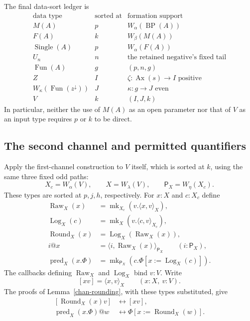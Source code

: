 The final data-sort ledger is
\[
\begin{array}{c|c|l}
\text{data type}&\text{sorted at}&\text{formation support}\\ \hline
M(A)&p&W_{\alpha}(\operatorname{BP}(A))\\
F(A)&k&W_{\beta}(M(A))\\
\operatorname{Single}(A)&p&W_{\alpha}(F(A))\\
U_n&n&\text{the retained negative's fixed tail}\\
\operatorname{Fun}(A)&g&(p,n,g)\\
Z&I&\zeta:\operatorname{Ax}(s)\longrightarrow I\text{ positive}\\
W_{\kappa}(\operatorname{Fun}(z^\downarrow))&J&\kappa:g\longrightarrow J\text{ even}\\
V&k&(I,J,k)
\end{array}
\]
In particular, neither the use of $M(A)$ as an open parameter nor that of
$V$ as an input type requires $p$ or $k$ to be direct.

\subsection{The second channel and permitted quantifiers}

Apply the first-channel construction to $V$ itself, which is sorted at
$k$, using the same three fixed odd paths:
\begin{equation}
 X_c=W_{\alpha}(V),\qquad
 X=W_{\lambda}(V),\qquad
 \mathsf P_X=W_{\eta}(X_c).
\label{chan-x-types}
\end{equation}
These types are sorted at $p,j,h$, respectively.  For $x:X$ and $c:X_c$
define
\[
\begin{aligned}
 \operatorname{Raw}_X(x)&=\operatorname{mk}_{X_c}
                          (v.\langle x,v\rangle_X),\\
 \operatorname{Log}_X(c)&=\operatorname{mk}_{X}
                          (v.\langle c,v\rangle_{X_c}),\\
 \operatorname{Round}_X(x)&=\operatorname{Log}_X(\operatorname{Raw}_X(x)),\\
 i@x&=\langle i,\operatorname{Raw}_X(x)\rangle_{\mathsf P_X}
                         \qquad(i:\mathsf P_X),\\
 \operatorname{pred}_X(x.\Phi)
   &=\operatorname{mk}_{\mathsf P_X}
                          (c.\Phi[x:=\operatorname{Log}_X(c)]).
\end{aligned}
\]
The callbacks defining $\operatorname{Raw}_X$ and
$\operatorname{Log}_X$ bind $v:V$.  Write
\[
 [xv]=\langle x,v\rangle_X\qquad(x:X,\ v:V).
\]
The proofs of Lemma~\ref{chan-rounding}, with these types substituted,
give
\begin{equation}
\begin{aligned}
 {}[\operatorname{Round}_X(x)v]&\leftrightarrow[xv],\\
 \operatorname{pred}_X(x.\Phi)@w
       &\leftrightarrow\Phi[x:=\operatorname{Round}_X(w)].
\end{aligned}
\label{chan-x-evaluation}
\end{equation}


